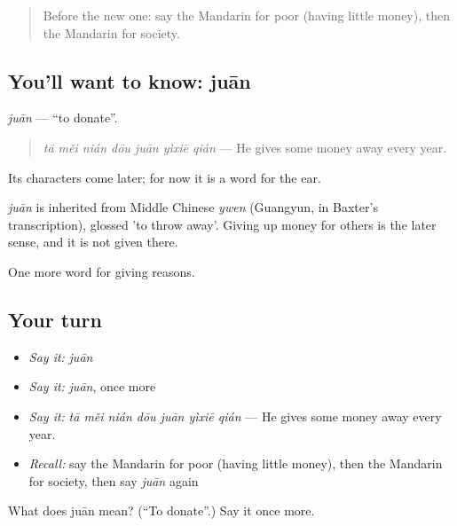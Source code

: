 \label{lesson:ZH-C375-juan}



\begin{quote}
Before the new one: say the Mandarin for poor (having little money), then the Mandarin for society.
\end{quote}

\subsection*{You'll want to know: juān}
\emph{juān} — \textquotedblleft{}to donate\textquotedblright{}.

\begin{quote}
\emph{tā měi nián dōu juān yìxiē qián} — He gives some money away every year.
\end{quote}

Its characters come later; for now it is a word for the ear.

\begin{cousinweb}
\emph{juān} is inherited from Middle Chinese \emph{ywen} (Guangyun, in Baxter's transcription), glossed 'to throw away'. Giving up money for others is the later sense, and it is not given there.
\end{cousinweb}

\begin{grammarlens}[title={What you've built}]
One more word for giving reasons.
\end{grammarlens}

\subsection*{Your turn}
\begin{itemize}
\raggedright
  \item \emph{Say it:} \emph{juān}
  \item \emph{Say it:} \emph{juān}, once more
  \item \emph{Say it:} \emph{tā měi nián dōu juān yìxiē qián} — He gives some money away every year.
  \item \emph{Recall:} say the Mandarin for poor (having little money), then the Mandarin for society, then say \emph{juān} again
\end{itemize}

\begin{tcolorbox}[breakable,colback=teal!4,colframe=teal!35!black,title={Before you move on}]
What does juān mean? (\textquotedblleft{}To donate\textquotedblright{}.) Say it once more.
\end{tcolorbox}
